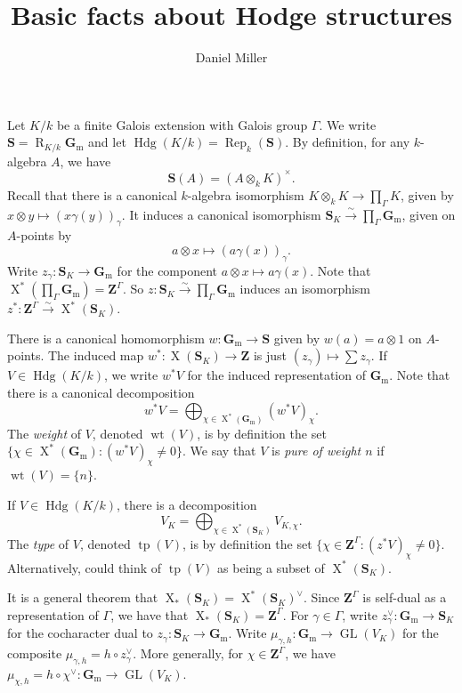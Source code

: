 \documentclass{article}
\title{Basic facts about Hodge structures}
\author{Daniel Miller}
\DeclareMathOperator{\chars}{X}
\DeclareMathOperator{\GL}{GL}
\DeclareMathOperator{\hodge}{Hdg}
\DeclareMathOperator{\rep}{Rep}
\DeclareMathOperator{\weight}{wt}
\DeclareMathOperator{\weil}{R}
\DeclareMathOperator{\type}{tp}
\newcommand{\dS}{\mathbf{S}}
\newcommand{\dZ}{\mathbf{Z}}
\newcommand{\Gm}{\mathbf{G}_\mathrm{m}}
\newcommand{\iso}{\xrightarrow\sim}
\begin{document}
\maketitle





Let $K/k$ be a finite Galois extension with Galois group $\Gamma$. We write 
$\dS=\weil_{K/k}\Gm$ and let $\hodge(K/k)=\rep_k(\dS)$. By definition, for 
any $k$-algebra $A$, we have 
\[
  \dS(A) = (A\otimes_k K)^\times .
\]
Recall that there is a canonical $k$-algebra isomorphism 
$K\otimes_k K\to \prod_\Gamma K$, given by 
$x\otimes y\mapsto (x\gamma(y))_\gamma$. It induces a canonical isomorphism 
$\dS_K\iso \prod_\Gamma\Gm$, given on $A$-points by 
\[
  a\otimes x\mapsto (a\gamma(x))_\gamma .
\]
Write $z_\gamma:\dS_K\to \Gm$ for the component $a\otimes x\mapsto a\gamma(x)$. 
Note that $\chars^\ast(\prod_\Gamma \Gm) = \dZ^\Gamma$. So 
$z:\dS_K\iso \prod_\Gamma\Gm$ induces an isomorphism 
$z^\ast:\dZ^\Gamma\iso \chars^\ast(\dS_K)$. 

There is a canonical homomorphism $w:\Gm\to \dS$ given by 
$w(a)=a\otimes 1$ on $A$-points. The induced map 
$w^\ast:\chars(\dS_K)\to \dZ$ is just $(z_\gamma)\mapsto \sum z_\gamma$. If 
$V\in \hodge(K/k)$, we write $w^\ast V$ for the induced representation of 
$\Gm$. Note that there is a canonical decomposition 
\[
  w^\ast V = \bigoplus_{\chi\in \chars^\ast(\Gm)} (w^\ast V)_\chi .
\]
The \emph{weight} of $V$, denoted $\weight(V)$, is by definition the set 
$\{\chi\in \chars^\ast(\Gm):(w^\ast V)_\chi\ne 0\}$. We say that $V$ is 
\emph{pure of weight $n$} if $\weight(V)=\{n\}$. 

If $V\in \hodge(K/k)$, there is a decomposition 
\[
  V_K = \bigoplus_{\chi\in \chars^\ast(\dS_K)} V_{K,\chi} .
\]
The \emph{type} of $V$, denoted $\type(V)$, is by definition the set 
$\{\chi\in \dZ^\Gamma:(z^\ast V)_\chi\ne 0\}$. Alternatively, could think of 
$\type(V)$ as being a subset of $\chars^\ast(\dS_K)$. 

It is a general theorem that $\chars_\ast(\dS_K)=\chars^\ast(\dS_K)^\vee$. 
Since $\dZ^\Gamma$ is self-dual as a representation of $\Gamma$, we have that 
$\chars_\ast(\dS_K) = \dZ^\Gamma$. For $\gamma\in \Gamma$, write 
$z_\gamma^\vee:\Gm\to \dS_K$ for the cocharacter dual to 
$z_\gamma:\dS_K\to \Gm$. Write $\mu_{\gamma,h}:\Gm\to \GL(V_K)$ for the 
composite $\mu_{\gamma,h} = h\circ z_\gamma^\vee$. More generally, for 
$\chi\in \dZ^\Gamma$, we have $\mu_{\chi,h}=h\circ \chi^\vee:\Gm\to \GL(V_K)$. 
\end{document}
